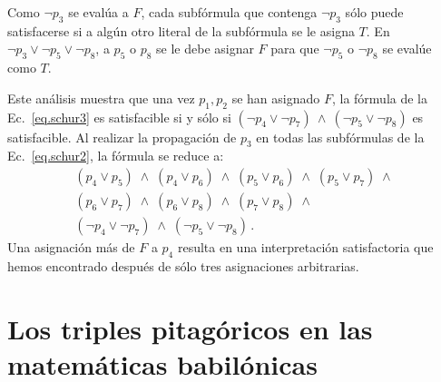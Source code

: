 Como $\neg p_3$ se evalúa a $F$, cada subfórmula que contenga $\neg p_3$ sólo puede satisfacerse si a algún otro literal de la subfórmula se le asigna $T$. En $\neg p_3 \vee \neg p_5 \vee \neg p_8$, a $p_5$ o $p_8$ se le debe asignar $F$ para que $\neg p_5$ o $\neg p_8$ se evalúe como $T$.

Este análisis muestra que una vez $p_1,p_2$ se han asignado $F$, la fórmula de la Ec.~\ref{eq.schur3} es satisfacible si y sólo si $(\neg p_4 \vee \neg p_7) \:\wedge\: (\neg p_5 \vee \neg p_8)$ es satisfacible. Al realizar la propagación de $p_3$ en todas las subfórmulas de la Ec.~\ref{eq.schur2}, la fórmula se reduce a:
\[
\begin{array}{l}
(p_4\vee p_5)\;\wedge\;(p_4\vee p_6)\;\wedge\;(p_5\vee p_6)\;\wedge\;(p_5\vee p_7)\;\wedge\;\\
(p_6\vee p_7)\;\wedge\;(p_6\vee p_8)\;\wedge\;(p_7\vee p_8)\;\wedge\\
(\neg p_4\vee \neg p_7)\;\wedge\;
(\neg p_5\vee \neg p_8)\,.
\end{array}
\]
Una asignación más de $F$ a $p_4$ resulta en una interpretación satisfactoria que hemos encontrado después de sólo tres asignaciones arbitrarias.


\section{Los triples pitagóricos en las matemáticas babilónicas}\label{s.plimpton}


